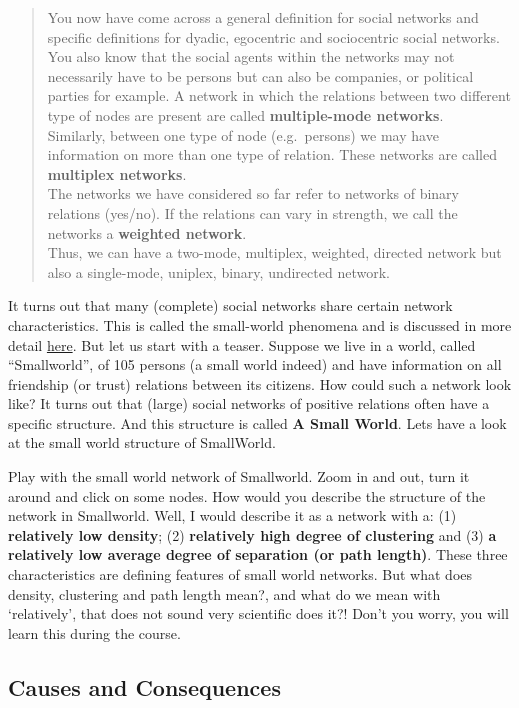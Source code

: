 \documentclass[
]{book}
\begin{document}
\begin{quote}
You now have come across a general definition for social networks and specific definitions for dyadic, egocentric and sociocentric social networks. You also know that the social agents within the networks may not necessarily have to be persons but can also be companies, or political parties for example. A network in which the relations between two different type of nodes are present are called \textbf{multiple-mode networks}.\\
Similarly, between one type of node (e.g.~persons) we may have information on more than one type of relation. These networks are called \textbf{multiplex networks}.\\
The networks we have considered so far refer to networks of binary relations (yes/no). If the relations can vary in strength, we call the networks a \textbf{weighted network}.\\
Thus, we can have a two-mode, multiplex, weighted, directed network but also a single-mode, uniplex, binary, undirected network.
\end{quote}

It turns out that many (complete) social networks share certain network characteristics. This is called the small-world phenomena and is discussed in more detail \href{}{here}. But let us start with a teaser. Suppose we live in a world, called ``Smallworld'', of 105 persons (a small world indeed) and have information on all friendship (or trust) relations between its citizens. How could such a network look like? It turns out that (large) social networks of positive relations often have a specific structure. And this structure is called \textbf{A Small World}. Lets have a look at the small world structure of SmallWorld.

Play with the small world network of Smallworld. Zoom in and out, turn it around and click on some nodes. How would you describe the structure of the network in Smallworld. Well, I would describe it as a network with a: (1) \textbf{relatively low density}; (2) \textbf{relatively high degree of clustering} and (3) \textbf{a relatively low average degree of separation (or path length)}. These three characteristics are defining features of small world networks. But what does density, clustering and path length mean?, and what do we mean with `relatively', that does not sound very scientific does it?! Don't you worry, you will learn this during the course.

\hypertarget{causes-and-consequences}{%
\subsection{Causes and Consequences}\label{causes-and-consequences}}
\end{document}

